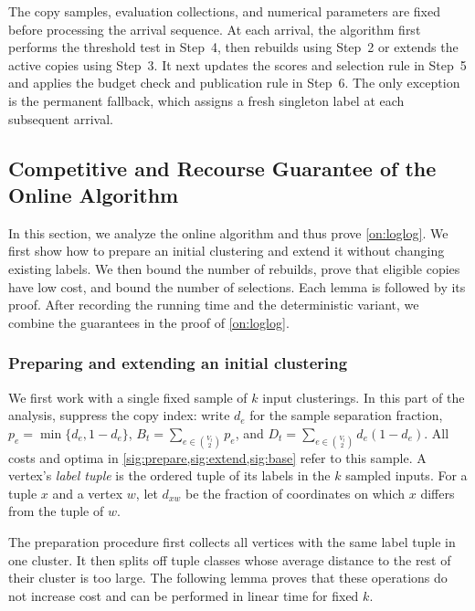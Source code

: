 \documentclass[11pt]{article}
\begin{document}
The copy samples, evaluation collections, and numerical parameters
are fixed before processing the arrival sequence. At each arrival,
the algorithm first performs the
threshold test in Step~4, then rebuilds using Step~2 or extends the
active copies using Step~3. It next updates the scores and selection
rule in Step~5 and applies the budget check and publication rule in
Step~6. The only exception is the permanent fallback, which assigns
a fresh singleton label at each subsequent arrival.

\subsection{Competitive and Recourse Guarantee of the Online Algorithm}
\label{sec:analysis-online}

In this section, we analyze the online algorithm and thus prove
\cref{on:loglog}. We first show how to prepare an initial clustering
and extend it without changing existing labels. We then bound the
number of rebuilds, prove that eligible copies have low cost, and
bound the number of selections. Each lemma is followed by its proof.
After recording the running time and the deterministic variant, we
combine the guarantees in the proof of \cref{on:loglog}.

\subsubsection{Preparing and extending an initial clustering}

We first work with a single fixed sample of $k$ input clusterings.
In this part of the analysis, suppress the copy index: write $d_e$
for the sample separation fraction, $p_e=\min\{d_e,1-d_e\}$,
$B_t=\sum_{e\in\binom{V_t}{2}}p_e$, and
$D_t=\sum_{e\in\binom{V_t}{2}}d_e(1-d_e)$.
All costs and optima in \cref{sig:prepare,sig:extend,sig:base} refer
to this sample. A vertex's \emph{label tuple} is the ordered tuple of
its labels in the $k$ sampled inputs. For a tuple $x$ and a vertex
$w$, let $d_{xw}$ be the fraction of coordinates on which $x$ differs
from the tuple of $w$.

The preparation procedure first collects all vertices with the same
label tuple in one cluster. It then splits off tuple classes whose
average distance to the rest of their cluster is too large. The
following lemma proves that these operations do not increase cost and
can be performed in linear time for fixed $k$.
\end{document}
